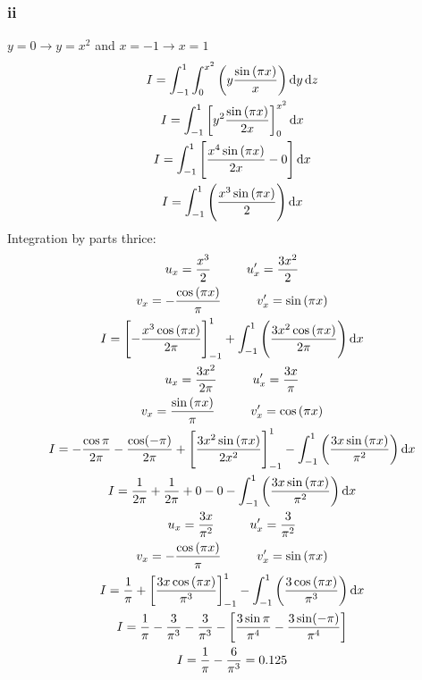 \documentclass[11pt]{article}
\numberwithin{equation}{section}
\begin{document}
\subsubsection{ii}
$y =0 \rightarrow y = x^2$ and $x = -1 \rightarrow x = 1 $
\begin{gather}
    I = \int_{-1}^{1} \int_{0}^{x^2} \left( y \frac{\sin\left(\pi x\right)}{x} \right) \dif y \dif z\\
    I = \int_{-1}^{1} \left[y^2 \frac{\sin\left(\pi x\right)}{2x}\right]_0^{x^2} \dif x\\
    I = \int_{-1}^{1} \left[\frac{x^4 \sin\left(\pi x \right)}{2x} - 0 \right] \dif x\\
    I = \int_{-1}^{1} \left(\frac{x^3 \sin\left(\pi x \right)}{2} \right) \dif x
\end{gather}
Integration by parts thrice: 
\begin{gather}
    u_x = \frac{x^3}{2} \hspace{1cm} u_x' = \frac{3x^2}{2}\\
    v_x = -\frac{\cos \left(\pi x\right)}{\pi} \hspace{1cm} v_x' = \sin \left(\pi x \right)\\
    I = \left[-\frac{x^3 \cos\left(\pi x\right)}{2\pi}\right]_{-1}^1 + \int_{-1}^1 \left(\frac{3x^2 \cos\left(\pi x\right)}{2\pi}\right) \dif x\\
    u_x = \frac{3x^2}{2\pi} \hspace{1cm} u_x' = \frac{3x}{\pi}\\
    v_x = \frac{\sin \left(\pi x\right)}{\pi} \hspace{1cm} v_x' = \cos \left(\pi x \right)\\
    I = - \frac{\cos \pi}{2\pi} - \frac{\cos(-\pi)}{2\pi} + \left[\frac{3x^2 \sin\left(\pi x\right)}{2x^2}\right]_{-1}^1 - \int_{-1}^1 \left(\frac{3x \sin\left(\pi x \right)}{\pi^2} \right) \dif x\\
    I = \frac{1}{2\pi} + \frac{1}{2\pi} + 0 - 0 - \int_{-1}^1 \left(\frac{3x \sin\left(\pi x \right)}{\pi^2} \right) \dif x\\
    u_x = \frac{3x}{\pi^2} \hspace{1cm} u_x' = \frac{3}{\pi^2}\\
    v_x = -\frac{\cos \left(\pi x\right)}{\pi} \hspace{1cm} v_x' = \sin \left(\pi x \right)\\
    I = \frac{1}{\pi} + \left[\frac{3x\cos\left(\pi x \right)}{\pi^3}\right]_{-1}^1 - \int_{-1}^1 \left(\frac{3\cos\left(\pi x\right)}{\pi^3}\right) \dif x\\
    I = \frac{1}{\pi} - \frac{3}{\pi^3} - \frac{3}{\pi^3} - \left[ \frac{3\sin\pi}{\pi^4} - \frac{3\sin(-\pi)}{\pi^4}\right]\\
    I = \frac{1}{\pi} - \frac{6}{\pi^3} = 0.125
\end{gather}
\end{document}
